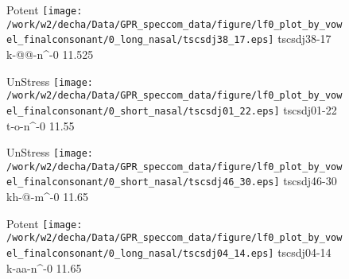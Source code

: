 \documentclass{article}
\begin{document}
\begin{figure}[t]
\begin{minipage}[b]{.24\textwidth}
\colorbox{Apricot}{Potent}
\centering
\texttt{[image: /work/w2/decha/Data/GPR\_speccom\_data/figure/lf0\_plot\_by\_vowel\_finalconsonant/0\_long\_nasal/tscsdj38\_17.eps]}
tscsdj38-17 k-@@-n\textasciicircum-0 11.525
\end{minipage}
\begin{minipage}[b]{.24\textwidth}
UnStress
\centering
\texttt{[image: /work/w2/decha/Data/GPR\_speccom\_data/figure/lf0\_plot\_by\_vowel\_finalconsonant/0\_short\_nasal/tscsdj01\_22.eps]}
tscsdj01-22 t-o-n\textasciicircum-0 11.55
\end{minipage}
\begin{minipage}[b]{.24\textwidth}
UnStress
\centering
\texttt{[image: /work/w2/decha/Data/GPR\_speccom\_data/figure/lf0\_plot\_by\_vowel\_finalconsonant/0\_short\_nasal/tscsdj46\_30.eps]}
tscsdj46-30 kh-@-m\textasciicircum-0 11.65
\end{minipage}
\begin{minipage}[b]{.24\textwidth}
\colorbox{Apricot}{Potent}
\centering
\texttt{[image: /work/w2/decha/Data/GPR\_speccom\_data/figure/lf0\_plot\_by\_vowel\_finalconsonant/0\_long\_nasal/tscsdj04\_14.eps]}
tscsdj04-14 k-aa-n\textasciicircum-0 11.65
\end{minipage}
\end{figure}
\end{document}
